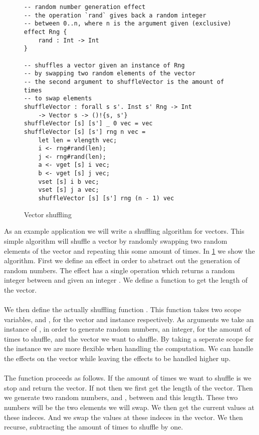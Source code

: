 \begin{figure}[H]
\caption{Vector shuffling}
\begin{verbatim}
-- random number generation effect
-- the operation `rand` gives back a random integer
-- between 0..n, where n is the argument given (exclusive)
effect Rng {
	rand : Int -> Int
}

-- shuffles a vector given an instance of Rng
-- by swapping two random elements of the vector
-- the second argument to shuffleVector is the amount of times
-- to swap elements
shuffleVector : forall s s'. Inst s' Rng -> Int
	-> Vector s -> ()!{s, s'}
shuffleVector [s] [s'] _ 0 vec = vec
shuffleVector [s] [s'] rng n vec =
	let len = vlength vec;
	i <- rng#rand(len);
	j <- rng#rand(len);
	a <- vget [s] i vec;
	b <- vget [s] j vec;
	vset [s] i b vec;
	vset [s] j a vec;
	shuffleVector [s] [s'] rng (n - 1) vec
\end{verbatim}
\label{fig:shuffle}
\end{figure}

As an example application we will write a shuffling algorithm for vectors.
This simple algorithm will shuffle a vector by randomly swapping two random elements of the vector and repeating this some amount of times.
In \cref{fig:shuffle} we show the algorithm.
First we define an effect  in order to abstract out the generation of random numbers.
The effect  has a single operation  which returns a random integer between  and  given an integer .
We define a function  to get the length of the vector.
\\\\
We then define the actually shuffling function .
This function takes two scope variables,  and , for the vector and  instance respectively.
As arguments we take an instance of , in order to generate random numbers, an integer, for the amount of times to shuffle, and the vector we want to shuffle.
By taking a seperate scope for the  instance we are more flexible when handling the computation.
We can handle the effects on the vector while leaving the  effects to be handled higher up.
\\\\
The function  proceeds as follows.
If the amount of times we want to shuffle is  we stop and return the vector.
If not then we first get the length of the vector.
Then we generate two random numbers,  and , between  and this length.
These two numbers will be the two elements we will swap.
We then get the current values at these indeces.
And we swap the values at these indeces in the vector.
We then recurse, subtracting the amount of times to shuffle by one.


